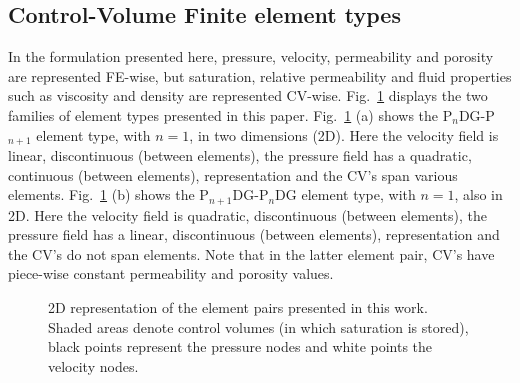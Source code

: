 \documentclass[preprint,authoryear,12pt]{elsarticle}
\begin{document}
\subsection{Control-Volume Finite element types}
In the formulation presented here, pressure, velocity, permeability
and porosity are represented FE-wise, but saturation, relative
permeability and fluid properties such as viscosity and density are
represented CV-wise. Fig.~\ref{fem_cv_represent_a} displays the two
families of element types presented in this
paper. Fig.~\ref{fem_cv_represent_a} (a) shows the P$_{n}$DG-P$_{n+1}$
element type, with $n = 1$, in two dimensions (2D). Here the velocity
field is linear, discontinuous (between elements), the pressure field
has a quadratic, continuous (between elements), representation and the
CV's span various elements. Fig.~\ref{fem_cv_represent_a} (b) shows
the P$_{n+1}$DG-P$_{n}$DG element type, with $n = 1$, also in 2D. Here
the velocity field is quadratic, discontinuous (between elements), the
pressure field has a linear, discontinuous (between elements),
representation and the CV's do not span elements. Note that in the
latter element pair, CV's have piece-wise constant permeability and
porosity values.

\begin{figure}[h!]
\caption{2D representation of the element pairs presented in this
  work. Shaded areas denote control volumes (in which saturation is
  stored), black points represent the pressure nodes and white points
  the velocity nodes.}
    \label{fem_cv_represent_a}
\end{figure} 
\end{document}
